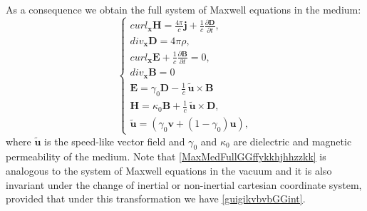 \documentclass{article}
\theoremstyle{definition}
\theoremstyle{remark}
\renewcommand{\vec}[1]{\mathbf{#1}}
\newcommand{\R}{\mathbb{R}}
\newcommand{\er}{\eqref}
\newcommand{\R}{{\mathbb{R}}}
\newcommand{\er}{\eqref}
\begin{document}
As a consequence we obtain the full system of Maxwell equations in
the medium:
\begin{equation}\label{MaxMedFullGGffykkhjhhzzkk}
\begin{cases}
curl_{\vec x} \vec H=\frac{4\pi}{c}\vec j+
\frac{1}{c}\frac{\partial \vec D}{\partial t},\\
div_{\vec x} \vec D=4\pi\rho,\\
curl_{\vec x} \vec E+\frac{1}{c}\frac{\partial \vec B}{\partial t}=0,\\
div_{\vec x} \vec B=0\\
\vec E=\gamma_0\vec D-\frac{1}{c}\,\vec {\tilde u}\times \vec B\\
\vec H=\kappa_0\vec B+\frac{1}{c}\,\vec {\tilde u}\times \vec D,\\
\vec {\tilde u}=\left(\gamma_0\vec v+(1-\gamma_0)\vec u\right),
\end{cases}
\end{equation}
where $\vec {\tilde u}$ is the speed-like vector field and
$\gamma_0$ and $\kappa_0$ are dielectric and magnetic permeability
of the medium. Note that \er{MaxMedFullGGffykkhjhhzzkk} is analogous
to the system of Maxwell equations in the vacuum and it is also
invariant under the change of inertial or non-inertial cartesian
coordinate system, provided that under this transformation we have
\er{guigikvbvbGGint}.
\end{document}
